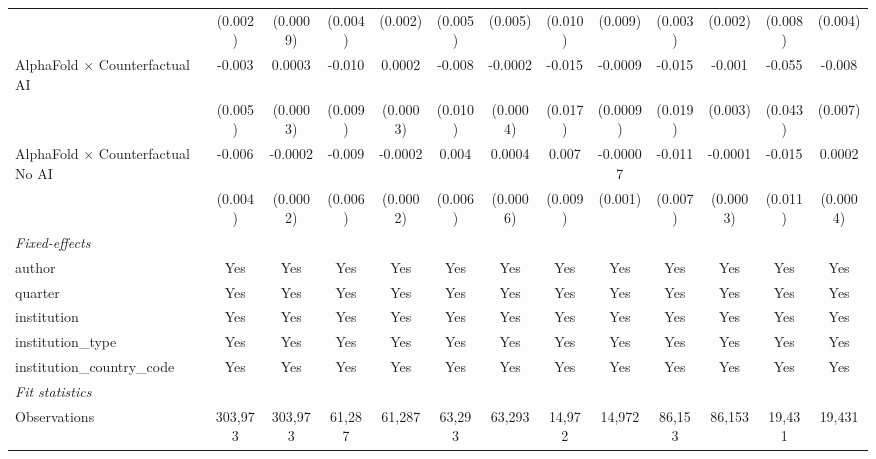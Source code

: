 \begin{tabular}{lcccccccccccc}
                                            & (0.002)       & (0.0009)       & (0.004) & (0.002)       & (0.005) & (0.005)  & (0.010) & (0.009)     & (0.003)      & (0.002)       & (0.008) & (0.004)\\   
   AlphaFold $\times$ Counterfactual AI     & -0.003        & 0.0003         & -0.010  & 0.0002        & -0.008  & -0.0002  & -0.015  & -0.0009     & -0.015       & -0.001        & -0.055  & -0.008\\   
                                            & (0.005)       & (0.0003)       & (0.009) & (0.0003)      & (0.010) & (0.0004) & (0.017) & (0.0009)    & (0.019)      & (0.003)       & (0.043) & (0.007)\\   
   AlphaFold $\times$ Counterfactual No AI  & -0.006        & -0.0002        & -0.009  & -0.0002       & 0.004   & 0.0004   & 0.007   & -0.00007    & -0.011       & -0.0001       & -0.015  & 0.0002\\   
                                            & (0.004)       & (0.0002)       & (0.006) & (0.0002)      & (0.006) & (0.0006) & (0.009) & (0.001)     & (0.007)      & (0.0003)      & (0.011) & (0.0004)\\   
   \midrule
   \emph{Fixed-effects}\\
   author                                   & Yes           & Yes            & Yes     & Yes           & Yes     & Yes      & Yes     & Yes         & Yes          & Yes           & Yes     & Yes\\  
   quarter                                  & Yes           & Yes            & Yes     & Yes           & Yes     & Yes      & Yes     & Yes         & Yes          & Yes           & Yes     & Yes\\  
   institution                              & Yes           & Yes            & Yes     & Yes           & Yes     & Yes      & Yes     & Yes         & Yes          & Yes           & Yes     & Yes\\  
   institution\_type                        & Yes           & Yes            & Yes     & Yes           & Yes     & Yes      & Yes     & Yes         & Yes          & Yes           & Yes     & Yes\\  
   institution\_country\_code               & Yes           & Yes            & Yes     & Yes           & Yes     & Yes      & Yes     & Yes         & Yes          & Yes           & Yes     & Yes\\  
   \midrule
   \emph{Fit statistics}\\
   Observations                             & 303,973       & 303,973        & 61,287  & 61,287        & 63,293  & 63,293   & 14,972  & 14,972      & 86,153       & 86,153        & 19,431  & 19,431\\  

\end{tabular}
